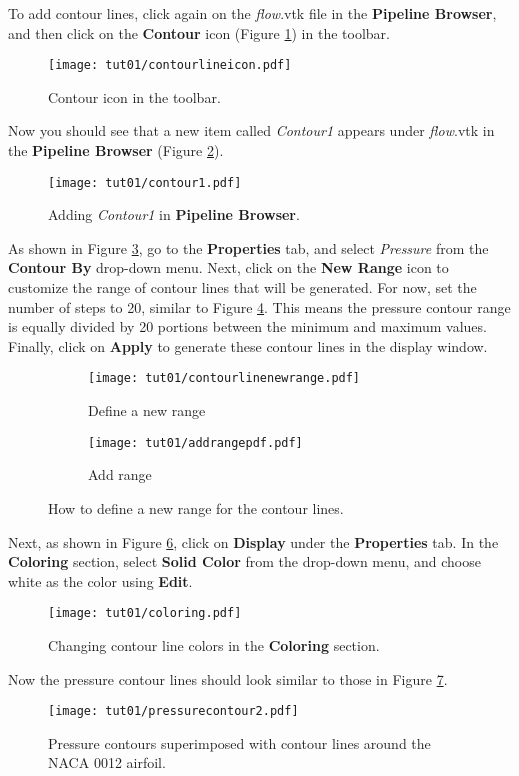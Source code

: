 To add contour lines, click again on the \textit{flow}.vtk file in the \textbf{Pipeline Browser}, and then click on the \textbf{Contour} icon (Figure \ref{fig1:contour_icon}) in the toolbar.
\begin{figure}[htbp]
    \centering
    \texttt{[image: tut01/contourlineicon.pdf]}
    \caption{Contour icon in the toolbar.}
    \label{fig1:contour_icon}
\end{figure}
Now you should see that a new item called \textit{Contour1} appears under \textit{flow}.vtk in the \textbf{Pipeline Browser} (Figure \ref{fig1:contour1}).
\begin{figure}[htbp]
    \centering
    \texttt{[image: tut01/contour1.pdf]}
    \caption{Adding \textit{Contour1} in \textbf{Pipeline Browser}.}
    \label{fig1:contour1}
\end{figure}
As shown in Figure \ref{fig1:contourby a}, go to the \textbf{Properties} tab, and select \textit{Pressure} from the \textbf{Contour By} drop-down menu. Next, click on the \textbf{New Range} icon to customize the range of contour lines that will be generated. For now, set the number of steps to 20, similar to Figure \ref{fig1:contourby b}. This means the pressure contour range is equally divided by 20 portions between the minimum and maximum values. Finally, click on \textbf{Apply} to generate these contour lines in the display window.
\begin{figure}[htbp]
    \centering
     \begin{subfigure}[b]{.4\textwidth}
         \centering
         \texttt{[image: tut01/contourlinenewrange.pdf]}
         \caption{Define a new range}
         \label{fig1:contourby a}
     \end{subfigure}
     \hfill
     \begin{subfigure}[b]{.4\textwidth}
         \centering
         \texttt{[image: tut01/addrangepdf.pdf]}
         \caption{Add range}
         \label{fig1:contourby b}
     \end{subfigure}     
    \caption{How to define a new range for the contour lines.}
    \label{fig1:contourby}
\end{figure}
Next, as shown in Figure \ref{fig1:colorby2}, click on \textbf{Display} under the \textbf{Properties} tab. In the \textbf{Coloring} section, select \textbf{Solid Color} from the drop-down menu, and choose white as the color using \textbf{Edit}.
\begin{figure}[htbp]
    \centering
    \texttt{[image: tut01/coloring.pdf]}
    \caption{Changing contour line colors in the \textbf{Coloring} section.}
    \label{fig1:colorby2}
\end{figure}
Now the pressure contour lines should look similar to those in Figure \ref{fig1:pressure_contour_lines}.
\begin{figure}[htbp]
    \centering
    \texttt{[image: tut01/pressurecontour2.pdf]}
    \caption{Pressure contours superimposed with contour lines around the NACA 0012 airfoil.}
    \label{fig1:pressure_contour_lines}
\end{figure}
